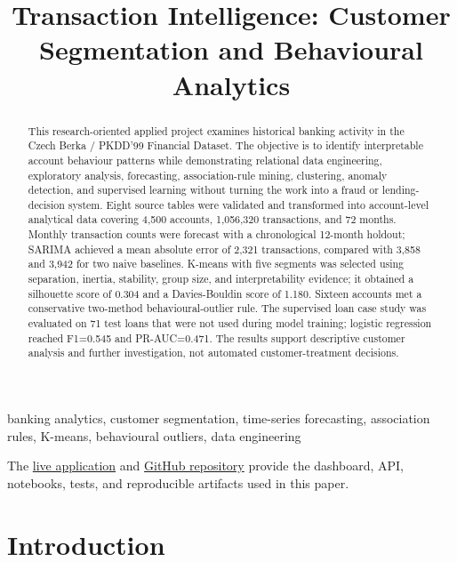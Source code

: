 \documentclass[conference]{IEEEtran}
\title{Transaction Intelligence: Customer Segmentation and Behavioural Analytics}
\author{
\IEEEauthorblockN{Antonio Sosa}
\IEEEauthorblockA{
MIA 5126 -- Essential Concepts in Data Science\\
Professor: Dr. Olubisi Runsewe\\
University of Ottawa, Ottawa, Canada
}
}
\begin{document}
\color{BrandText}
\maketitle

\begin{abstract}
This research-oriented applied project examines historical banking activity in the Czech Berka / PKDD'99 Financial Dataset. The objective is to identify interpretable account behaviour patterns while demonstrating relational data engineering, exploratory analysis, forecasting, association-rule mining, clustering, anomaly detection, and supervised learning without turning the work into a fraud or lending-decision system. Eight source tables were validated and transformed into account-level analytical data covering 4,500 accounts, 1,056,320 transactions, and 72 months. Monthly transaction counts were forecast with a chronological 12-month holdout; SARIMA achieved a mean absolute error of 2,321 transactions, compared with 3,858 and 3,942 for two naive baselines. K-means with five segments was selected using separation, inertia, stability, group size, and interpretability evidence; it obtained a silhouette score of 0.304 and a Davies-Bouldin score of 1.180. Sixteen accounts met a conservative two-method behavioural-outlier rule. The supervised loan case study was evaluated on 71 test loans that were not used during model training; logistic regression reached F1=0.545 and PR-AUC=0.471. The results support descriptive customer analysis and further investigation, not automated customer-treatment decisions.
\end{abstract}

\begin{IEEEkeywords}
banking analytics, customer segmentation, time-series forecasting, association rules, K-means, behavioural outliers, data engineering
\end{IEEEkeywords}

{\footnotesize
\noindent{}
The \href{https://transaction-intelligence-customer.onrender.com}{live application}
and \href{https://github.com/antonsoss/transaction-intelligence-customer-analytics}
{GitHub repository} provide the dashboard, API, notebooks, tests, and reproducible
artifacts used in this paper.
\par}

\section{Introduction}
\end{document}
